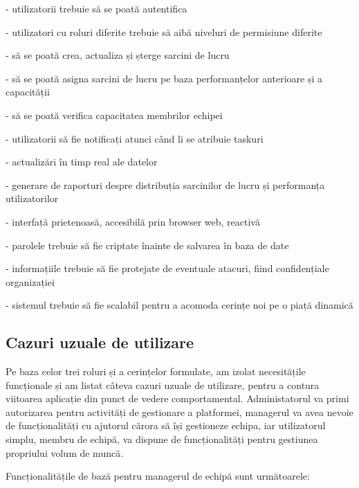 - utilizatorii trebuie să se poată autentifica

- utilizatori cu roluri diferite trebuie să aibă niveluri de permisiune diferite

- să se poată crea, actualiza și șterge sarcini de lucru

- să se poată asigna sarcini de lucru pe baza performanțelor anterioare și a capacității

- să se poată verifica capacitatea membrilor echipei

- utilizatorii să fie notificați atunci când li se atribuie taskuri

- actualizări în timp real ale datelor

- generare de raporturi despre distribuția sarcinilor de lucru și performanța utilizatorilor

- interfață prietenoasă, accesibilă prin browser web, reactivă

- parolele trebuie să fie criptate înainte de salvarea în baza de date

- informațiile trebuie să fie protejate de eventuale atacuri, fiind confidențiale organizației

- sistemul trebuie să fie scalabil pentru a acomoda cerințe noi pe o piață dinamică

\subsection{Cazuri uzuale de utilizare}
Pe baza celor trei roluri și a cerințelor formulate, am izolat necesitățile funcționale și am listat câteva cazuri uzuale de utilizare, pentru a contura viitoarea aplicație din punct de vedere comportamental. Administatorul va primi autorizarea pentru activități de gestionare a platformei, managerul va avea nevoie de funcționalități cu ajutorul cărora să își gestioneze echipa, iar utilizatorul simplu, membru de echipă, va dispune de funcționalități pentru gestiunea propriului volum de muncă.

Funcționalitățile de bază pentru managerul de echipă sunt următoarele:

